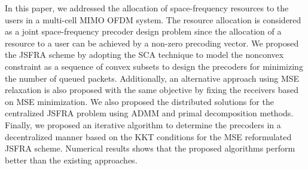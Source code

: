 
In this paper, we addressed the allocation of space-frequency resources to the users in a multi-cell \ac{MIMO} \ac{OFDM} system. The resource allocation is considered as a joint space-frequency precoder design problem since the allocation of a resource to a user can be achieved by a non-zero precoding vector. We proposed the \ac{JSFRA} scheme by adopting the \ac{SCA} technique to model the nonconvex constraint as a sequence of convex subsets to design the precoders for minimizing the number of queued packets. Additionally, an alternative approach using \ac{MSE} relaxation is also proposed with the same objective by fixing the receivers based on \ac{MSE} minimization. We also proposed the distributed solutions for the centralized \ac{JSFRA} problem using \ac{ADMM} and primal decomposition methods. Finally, we proposed an iterative algorithm to determine the precoders in a decentralized manner based on the \ac{KKT} conditions for the \ac{MSE} reformulated \ac{JSFRA} scheme. Numerical results shows that the proposed algorithms perform better than the existing approaches.